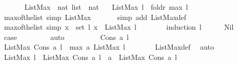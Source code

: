 \begin{isabellebody}
\endisatagproof
{\isafoldproof}%
%
\isadelimproof
\ \ \ \ \ \isanewline
%
\endisadelimproof
\isanewline
{}\isamarkupfalse%
\ ListMax\ {\isacharcolon}{\isacharcolon}\ {\isachardoublequoteopen}nat\ list\ {\isasymRightarrow}\ nat{\isachardoublequoteclose}\ \isanewline
\ \ {\isachardoublequoteopen}ListMax\ l\ {\isacharequal}\ foldr\ max\ l\ {}{\isachardoublequoteclose}\isanewline
\isanewline
{}\isamarkupfalse%
\ max{\isacharunderscore}of{\isacharunderscore}the{\isacharunderscore}list{\isacharunderscore}{}\ {\isacharbrackleft}simp{\isacharbrackright}{\isacharcolon}\ {\isachardoublequoteopen}ListMax\ {\isacharbrackleft}{\isacharbrackright}\ {\isacharequal}\ {}{\isachardoublequoteclose}\isanewline
%
\isadelimproof
\ \ %
\endisadelimproof
%
\isatagproof
{}\isamarkupfalse%
\ {\isacharparenleft}simp\ add{\isacharcolon}\ ListMax{\isacharunderscore}def{\isacharparenright}%
\endisatagproof
{\isafoldproof}%
%
\isadelimproof
\isanewline
%
\endisadelimproof
\isanewline
{}\isamarkupfalse%
\ max{\isacharunderscore}of{\isacharunderscore}the{\isacharunderscore}list\ {\isacharbrackleft}simp{\isacharbrackright}{\isacharcolon}\ {\isachardoublequoteopen}{\isasymforall}x\ {\isasymin}\ set\ l{\isachardot}\ x\ {\isasymle}\ ListMax\ l{\isachardoublequoteclose}\ \ \ \ \isanewline
%
\isadelimproof
\ \ %
\endisadelimproof
%
\isatagproof
{}\isamarkupfalse%
\ {\isacharparenleft}induction\ l{\isacharparenright}\isanewline
\ \ \ \ \isamarkupfalse%
\ Nil\isanewline
\ \ \ \ \isamarkupfalse%
\ \isamarkupfalse%
\ {\isacharquery}case\ \isanewline
\ \ \ \ \ \ \isamarkupfalse%
\ auto\ \isanewline
\ \ \isamarkupfalse%
\isanewline
\ \ \ \ \isamarkupfalse%
\ {\isacharparenleft}Cons\ a\ l{\isacharparenright}\isanewline
\ \ \ \ \isamarkupfalse%
\ {\isachardoublequoteopen}ListMax\ {\isacharparenleft}Cons\ a\ l{\isacharparenright}\ {\isacharequal}\ max\ a\ {\isacharparenleft}ListMax\ l{\isacharparenright}{\isachardoublequoteclose}\isanewline
\ \ \ \ \ \ \isamarkupfalse%
\ ListMax{\isacharunderscore}def\ \isamarkupfalse%
\ auto\isanewline
\ \ \ \ \isamarkupfalse%
\ {\isachardoublequoteopen}ListMax\ l\ {\isasymle}\ ListMax\ {\isacharparenleft}Cons\ a\ l{\isacharparenright}\ {\isasymand}\ a\ {\isasymle}\ ListMax\ {\isacharparenleft}Cons\ a\ l{\isacharparenright}{\isachardoublequoteclose}\isanewline
\ \ \ \ \ \ \isamarkupfalse%

\end{isabellebody}
